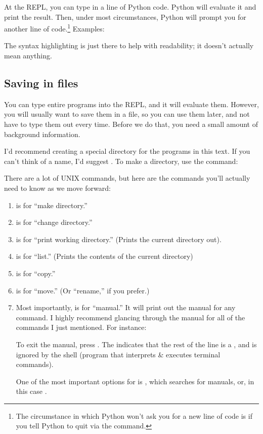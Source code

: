 At the REPL, you can type in a line of Python code. Python will
evaluate it and print the result. Then, under most circumstances,
Python will prompt you for another line of code.\footnote{The
  circumstance in which Python won't ask you for a new line of code is
  if you tell Python to quit via the  command.} Examples:


\begin{remark}
  The syntax highlighting is just there to help with readability; it
  doesn't actually mean anything.
\end{remark}

\subsection{Saving in files}

You can type entire programs into the REPL, and it will evaluate
them. However, you will usually want to save them in a file, so you
can use them later, and not have to type them out every time. Before
we do that, you need a small amount of background information.

I'd recommend creating a special directory for the programs in this
text. If you can't think of a name, I'd suggest . To make a
directory, use the  command:


There are a lot of UNIX commands, but here are the commands you'll
actually need to know as we move forward:

\begin{enumerate}
\item {} is for ``make directory.''
\item {} is for ``change directory.''
\item {} is for ``print working directory.'' (Prints the
  current directory out).
\item {} is for ``list.'' (Prints the contents of the current
  directory)
\item {} is for ``copy.''
\item {} is for ``move.'' (Or ``rename,'' if you prefer.)
\item Most importantly,  is for ``manual.'' It will print
  out the manual for any command. I highly recommend glancing through
  the manual for all of the commands I just mentioned. For instance:


  To exit the manual, press . The \code{#} indicates that the
  rest of the line is a , and is ignored by the shell
  (program that interprets \& executes terminal commands).

  One of the most important options for  is ,
  which searches for manuals, or, in this case .

\end{enumerate}

